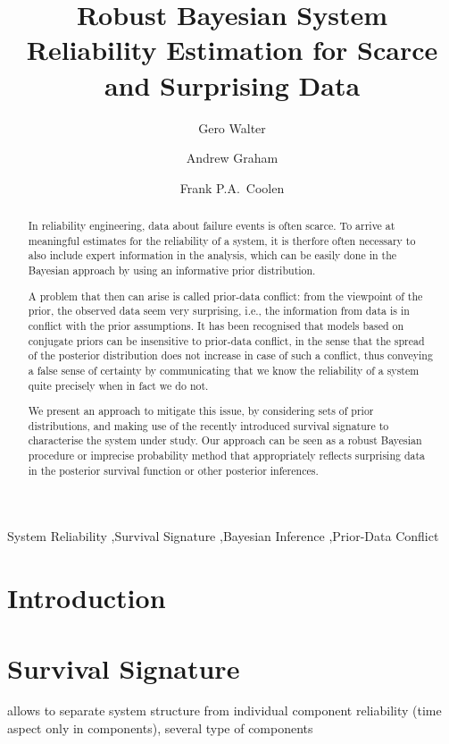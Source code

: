 \documentclass[authoryear]{elsarticle}
\title{Robust Bayesian System Reliability Estimation for Scarce and Surprising Data}
\author[eindh]{Gero Walter}
\author[durham]{Andrew Graham}
\author[durham]{Frank P.A.~Coolen}
\begin{document}
\maketitle

\begin{abstract}
In reliability engineering, data about failure events is often scarce.
To arrive at meaningful estimates for the reliability of a system,
it is therfore often necessary to also include expert information in the analysis,
which can be easily done in the Bayesian approach by using an informative prior distribution.

A problem that then can arise is called prior-data conflict:
from the viewpoint of the prior, the observed data seem very surprising,
i.e., the information from data is in conflict with the prior assumptions.
It has been recognised that models based on conjugate priors can be insensitive to prior-data conflict,
in the sense that the spread of the posterior distribution does not increase in case of such a conflict,
thus conveying a false sense of certainty by communicating that we know the reliability of a system quite precisely when in fact we do not.

We present an approach to mitigate this issue, by considering sets of prior distributions,
and making use of the recently introduced survival signature to characterise the system under study.
Our approach can be seen as a robust Bayesian procedure or imprecise probability method
that appropriately reflects surprising data in the posterior survival function or other posterior inferences.
\end{abstract}

\begin{keyword}
System Reliability \sep Survival Signature \sep Bayesian Inference \sep Prior-Data Conflict
\end{keyword}


\section{Introduction}



\section{Survival Signature}

allows to separate system structure from individual component reliability (time aspect only in components),
several type of components
\end{document}
